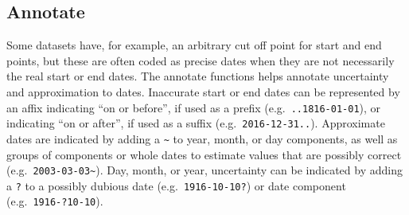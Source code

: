 \documentclass[
]{jss}
\begin{document}
\hypertarget{annotate}{%
\subsection{Annotate}\label{annotate}}

Some datasets have, for example, an arbitrary cut off point for start
and end points, but these are often coded as precise dates when they are
not necessarily the real start or end dates. The annotate functions
helps annotate uncertainty and approximation to dates. Inaccurate start
or end dates can be represented by an affix indicating ``on or before'',
if used as a prefix (e.g.~\texttt{..1816-01-01}), or indicating ``on or
after'', if used as a suffix (e.g.~\texttt{2016-12-31..}). Approximate
dates are indicated by adding a \texttt{\textasciitilde{}} to year,
month, or day components, as well as groups of components or whole dates
to estimate values that are possibly correct
(e.g.~\texttt{2003-03-03\textasciitilde{}}). Day, month, or year,
uncertainty can be indicated by adding a \texttt{?} to a possibly
dubious date (e.g.~\texttt{1916-10-10?}) or date component
(e.g.~\texttt{1916-?10-10}).
\end{document}
